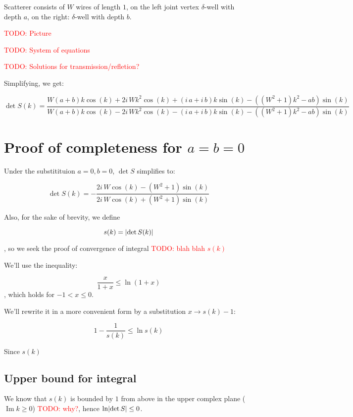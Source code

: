\documentclass[12pt, a4paper]{article}
\DeclarePairedDelimiter{\abs}{\lvert}{\rvert}
\renewcommand{\Im}{\operatorname{Im}}
\newcommand{\todo}[1]{{\large \textcolor{red}{TODO: #1}}}
\begin{document}
Scatterer consists of $W$ wires of length $1$, on the left joint vertex $\delta$-well with depth $a$, on the right: $\delta$-well with depth $b$. 

\todo{Picture}

\todo{System of equations}

\todo{Solutions for transmission/refletion?}

Simplifying, we get:

\[
\det S(k) = \frac{W {\left(a + b\right)} k \cos\left(k\right) + 2 i \, W k^{2} \cos\left(k\right) + {\left(i \, a + i \, b\right)} k \sin\left(k\right) - {\left({\left(W^{2} + 1\right)} k^{2} - a b\right)} \sin\left(k\right)}{W {\left(a + b\right)} k \cos\left(k\right) - 2 i \, W k^{2} \cos\left(k\right) - {\left(i \, a + i \, b\right)} k \sin\left(k\right) - {\left({\left(W^{2} + 1\right)} k^{2} - a b\right)} \sin\left(k\right)}
\]



\section*{Proof of completeness for $a = b = 0$}
Under the substitituion $a = 0, b = 0$, $\det S$ simplifies to:

\[
\det S(k) = - \frac{2 i \, W \cos\left(k\right) - {\left(W^{2} + 1\right)} \sin\left(k\right)}{2 i \, W \cos\left(k\right) + {\left(W^{2} + 1\right)} \sin\left(k\right)}
\]

Also, for the sake of brevity, we define 

\[
s(k) = \abs{\det S(k)}
\]

, so we seek the proof of convergence of integral \todo{blah blah $s(k)$}

We'll use the inequality:

\[
\frac{x}{1 + x} \le \ln(1 + x)
\]
, which holds for $-1 < x \le 0$. %

We'll rewrite it in a more convenient form by a substitution $x \to s(k) - 1$:

\[
1 - \frac{1}{s(k)} \le \ln s(k)
\]

Since $s(k)$ 

\subsection{Upper bound for integral}

We know that $s(k)$ is bounded by $1$ from above in the upper complex plane  ($\Im k \ge 0$) \todo{why?}, hence $\ln \abs{\det S} \le 0$.
\end{document}
